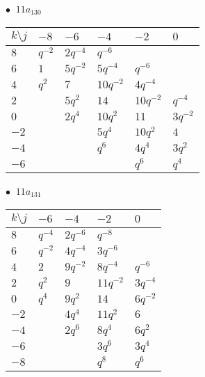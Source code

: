 \begin{minipage}{\linewidth}
$\bullet\ $ $11a_{130}$ \vspace{0.5em} \\
\begin{tabular}{l|lllll}
$k \setminus j$ & $-8$ & $-6$ & $-4$ & $-2$ & $0$ \\
\hline
$8$ & $q^{-2}$ & $2q^{-4}$ & $q^{-6}$ &  &  \\
$6$ & $1$ & $5q^{-2}$ & $5q^{-4}$ & $q^{-6}$ &  \\
$4$ & $q^{2}$ & $7$ & $10q^{-2}$ & $4q^{-4}$ &  \\
$2$ &  & $5q^{2}$ & $14$ & $10q^{-2}$ & $q^{-4}$ \\
$0$ &  & $2q^{4}$ & $10q^{2}$ & $11$ & $3q^{-2}$ \\
$-2$ &  &  & $5q^{4}$ & $10q^{2}$ & $4$ \\
$-4$ &  &  & $q^{6}$ & $4q^{4}$ & $3q^{2}$ \\
$-6$ &  &  &  & $q^{6}$ & $q^{4}$ \\
\end{tabular}
\vspace{2em}
\end{minipage}
%
\begin{minipage}{\linewidth}
$\bullet\ $ $11a_{131}$ \vspace{0.5em} \\
\begin{tabular}{l|llll}
$k \setminus j$ & $-6$ & $-4$ & $-2$ & $0$ \\
\hline
$8$ & $q^{-4}$ & $2q^{-6}$ & $q^{-8}$ &  \\
$6$ & $q^{-2}$ & $4q^{-4}$ & $3q^{-6}$ &  \\
$4$ & $2$ & $9q^{-2}$ & $8q^{-4}$ & $q^{-6}$ \\
$2$ & $q^{2}$ & $9$ & $11q^{-2}$ & $3q^{-4}$ \\
$0$ & $q^{4}$ & $9q^{2}$ & $14$ & $6q^{-2}$ \\
$-2$ &  & $4q^{4}$ & $11q^{2}$ & $6$ \\
$-4$ &  & $2q^{6}$ & $8q^{4}$ & $6q^{2}$ \\
$-6$ &  &  & $3q^{6}$ & $3q^{4}$ \\
$-8$ &  &  & $q^{8}$ & $q^{6}$ \\
\end{tabular}
\vspace{2em}
\end{minipage}
%
